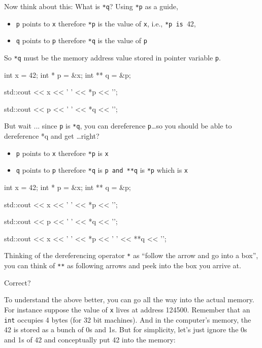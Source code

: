 Now think about this: What is \texttt{*q}? Using \texttt{*p} as a guide,

\begin{itemize}

\item
  \texttt{p} points to \texttt{x} therefore \texttt{*p} is the value of
  \texttt{x}, i.e., \texttt{*p is }42,
\item
  \texttt{q} points to \texttt{p} therefore \texttt{*q} is the value of
  \texttt{p}
\end{itemize}

So \texttt{*q} must be the memory address value stored in pointer variable \texttt{p}.

\begin{consolethree}[escapeinside=||]
int x = 42;
int * p = &x;
int ** q = &p;

std::cout << x << ' ' << *p << '\n';

std::cout << p << ' ' << *q << '\n';
\end{consolethree}
But wait ... since \texttt{p} is \texttt{*q}, you can dereference \texttt{p}\ldots so you should be able to dereference *q and get \ldots right?

\begin{itemize}

\item
  \texttt{p} points to \texttt{x} therefore \texttt{*p} is \texttt{x}
\item
  \texttt{q} points to \texttt{p} therefore \texttt{*q} is \texttt{p and **q} is
  \texttt{*p} which is \texttt{x}
\end{itemize}

\begin{consolethree}[escapeinside=||]
int x = 42;
int * p = &x;
int ** q = &p;

std::cout << x << ' ' << *p << '\n';

std::cout << p << ' ' << *q << '\n';

std::cout << x << ' ' << *p << ' '
          << **q << '\n';
\end{consolethree}
Thinking of the dereferencing operator \texttt{*} as ``follow the arrow and go into a box'', you can think of \texttt{**} as following  arrows and peek into the box you arrive at.

Correct?

To understand the above better, you can go all the way into the actual memory. For instance suppose the value of \texttt{x} lives at address 124500. Remember that an \texttt{int} occupies 4 bytes (for 32 bit machines). And in the computer's memory, the 42 is stored as a bunch of 0s and 1s. But for simplicity, let's just ignore the 0s and 1s of 42 and conceptually put 42 into the memory:

